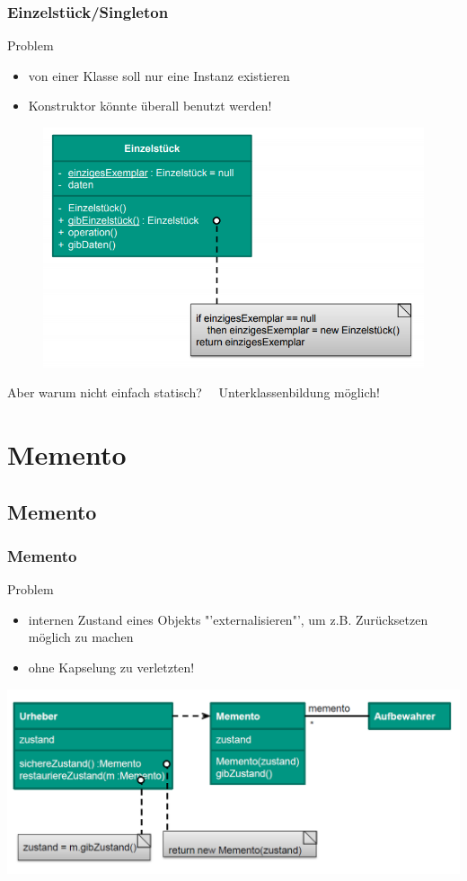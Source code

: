 \documentclass[18pt]{beamer}
\begin{document}
	\begin{frame}
		\frametitle{Einzelstück/Singleton}
		\begin{block}{Problem}
			\begin{itemize}
				\item von einer Klasse soll nur eine Instanz existieren
				\item Konstruktor könnte überall benutzt werden!
			\end{itemize}
		\end{block}
		\pause
		\centering
		\begin{figure}
			\includegraphics[scale=0.3]{./pics/tut4/singleton.png}
		\end{figure}
		\pause
		Aber warum nicht einfach statisch?\pause ~~ Unterklassenbildung möglich!
	\end{frame}

	\section{Memento}
	\subsection{Memento}
	\begin{frame}
		\frametitle{Memento}
		\begin{block}{Problem}
			\begin{itemize}
				\item internen Zustand eines Objekts "'externalisieren"', um z.B. Zurücksetzen möglich zu machen \pause 
				\item ohne Kapselung zu verletzten!
			\end{itemize}
		\end{block}
		\pause
		\centering
		\includegraphics[scale=0.4]{./pics/tut4/mem.png}
	\end{frame}
\end{document}

